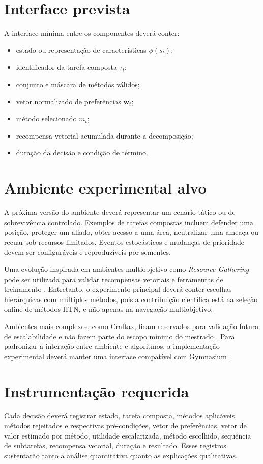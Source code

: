 

\section{Interface prevista}

A interface mínima entre os componentes deverá conter:

\begin{itemize}
\item estado ou representação de características $\phi(s_t)$;
\item identificador da tarefa composta $\tau_t$;
\item conjunto e máscara de métodos válidos;
\item vetor normalizado de preferências $\mathbf{w}_t$;
\item método selecionado $m_t$;
\item recompensa vetorial acumulada durante a decomposição;
\item duração da decisão e condição de término.
\end{itemize}

\section{Ambiente experimental alvo}

A próxima versão do ambiente deverá representar um cenário tático ou de
sobrevivência controlado.
Exemplos de tarefas compostas incluem defender uma posição, proteger um aliado,
obter acesso a uma área, neutralizar uma ameaça ou recuar sob recursos limitados.
Eventos estocásticos e mudanças de prioridade devem ser configuráveis e
reproduzíveis por sementes.

Uma evolução inspirada em ambientes multiobjetivo como
\textit{Resource Gathering} pode ser utilizada para validar recompensas
vetoriais e ferramentas de treinamento \cite{resourcegathering,mogymnasium,morlbaselines}.
Entretanto, o experimento principal deverá conter escolhas hierárquicas com
múltiplos métodos, pois a contribuição científica está na seleção online de
métodos HTN, e não apenas na navegação multiobjetivo.

Ambientes mais complexos, como Craftax, ficam reservados para validação futura
de escalabilidade e não fazem parte do escopo mínimo do mestrado
\cite{craftax2024,craftaxgithub}. Para padronizar a interação entre ambiente e
algoritmos, a implementação experimental deverá manter uma interface compatível
com Gymnasium \cite{gymnasium}.

\section{Instrumentação requerida}

Cada decisão deverá registrar estado, tarefa composta, métodos aplicáveis,
métodos rejeitados e respectivas pré-condições, vetor de preferências, vetor de
valor estimado por método, utilidade escalarizada, método escolhido, sequência
de subtarefas, recompensa vetorial, duração e resultado.
Esses registros sustentarão tanto a análise quantitativa quanto as explicações
qualitativas.
